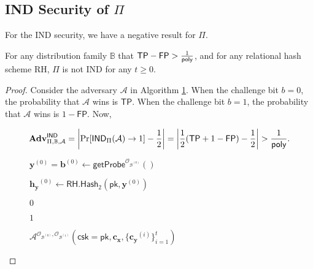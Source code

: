 
\subsection{IND Security of $\Pi$}
\label{sec:security_analysis:rh:IND}

For the IND security, we have a negative result for $\Pi$.

\begin{theorem}

For any distribution family $\mathbb{B}$ that $\textsf{TP} - \textsf{FP} > \frac{1}{\mathsf{poly}}$, and for any relational hash scheme \textsf{RH}, $\Pi$ is not IND for any $t \geq 0$.

\end{theorem}

\begin{proof}

Consider the adversary $\mathcal{A}$ in Algorithm \ref{alg:rh:ind}. When the challenge bit $b = 0$, the probability that $\mathcal{A}$ wins is $\textsf{TP}$. When the challenge bit $b = 1$, the probability that $\mathcal{A}$ wins is $1 - \textsf{FP}$. Now, 

\[
	\mathbf{Adv}_{\Pi, \mathbb{B}, \mathcal{A}}^{\textsf{IND}} = \left| \Pr[ \textsf{IND}_\Pi(\mathcal{A}) \to 1 ] - \frac{1}{2} \right| = \left| \frac{1}{2} (\textsf{TP} + 1 - \textsf{FP}) - \frac{1}{2} \right| > \frac{1}{\mathsf{poly}}.
\]

\begin{figure}[h]
\centering

	\begin{minipage}[t]{0.65\textwidth}
	\begin{algorithm}[H]
	\caption{$\mathcal{A}^{\mathcal{O}_{\mathcal{B}^{(0)}}, \mathcal{O}_{\mathcal{B}^{(1)}}} ( \textsf{csk} = \textsf{pk}, \mathbf{c_x}, \{ \mathbf{c_y}^{(i)} \}_{i=1}^t )$}
	\label{alg:rh:ind}
	\begin{algorithmic}[1]

		\State $\mathbf{y}^{(0)} = \mathbf{b}^{(0)} \gets \textsf{getProbe}^{\mathcal{O}_{\mathcal{B}^{(0)}}}()$
		
		\State $\mathbf{h_y}^{(0)} \gets \textsf{RH.Hash}_2(\textsf{pk}, \mathbf{y}^{(0)})$
		
		
			\State \Return $0$
		
		\Else
			
			\State \Return $1$
		
		\EndIf
	\end{algorithmic}
	\end{algorithm}
	\end{minipage}

\end{figure}

\end{proof}

